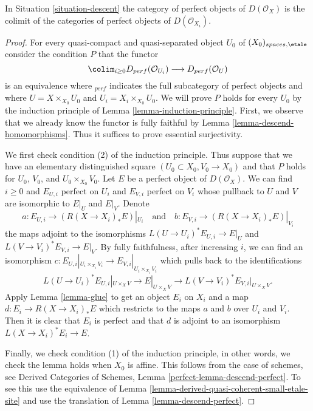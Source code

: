 \begin{lemma}
\label{lemma-perfect-on-limit}
In Situation \ref{situation-descent} the category of perfect
objects of $D(\mathcal{O}_X)$ is the colimit of the categories
of perfect objects of $D(\mathcal{O}_{X_i})$.
\end{lemma}

\begin{proof}
For every quasi-compact and quasi-separated object $U_0$ of
$(X_0)_{spaces, \etale}$ consider the condition $P$ that
the functor
$$
\colim_{i \geq 0} D_{perf}(\mathcal{O}_{U_i})
\longrightarrow
D_{perf}(\mathcal{O}_U)
$$
is an equivalence where ${}_{perf}$ indicates the full subcategory of
perfect objects and where $U = X \times_{X_0} U_0$ and
$U_i = X_i \times_{X_0} U_0$. We will prove $P$ holds for every $U_0$
by the induction principle of Lemma \ref{lemma-induction-principle}.
First, we observe that we already know the functor is fully faithful
by Lemma \ref{lemma-descend-homomorphisms}. Thus it suffices to prove
essential surjectivity.

\medskip\noindent
We first check condition (2) of the induction principle. Thus suppose
that we have an elementary distinguished square
$(U_0 \subset X_0, V_0 \to X_0)$ and that $P$ holds for
$U_0$, $V_0$, and $U_0 \times_{X_0} V_0$. Let $E$ be a perfect object
of $D(\mathcal{O}_X)$. We can find $i \geq 0$ and $E_{U, i}$ perfect on $U_i$
and $E_{V, i}$ perfect on $V_i$ whose pullback to $U$ and $V$ are isomorphic
to $E|_U$ and $E|_V$. Denote
$$
a : E_{U, i} \to (R(X \to X_i)_*E)|_{U_i}
\quad\text{and}\quad
b : E_{V, i} \to (R(X \to X_i)_*E)|_{V_i}
$$
the maps adjoint to the isomorphisms $L(U \to U_i)^*E_{U, i} \to E|_U$
and $L(V \to V_i)^*E_{V, i} \to E|_V$. By fully faithfulness, after
increasing $i$, we can find an isomorphism
$c : E_{U, i}|_{U_i \times_{X_i} V_i} \to E_{V, i}|_{U_i \times_{X_i} V_i}$
which pulls back to the identifications 
$$
L(U \to U_i)^*E_{U, i}|_{U \times_X V} \to E|_{U \times_X V} \to
L(V \to V_i)^*E_{V, i}|_{U \times_X V}.
$$
Apply Lemma \ref{lemma-glue}
to get an object $E_i$ on $X_i$ and a map $d : E_i \to R(X \to X_i)_*E$
which restricts to the maps $a$ and $b$ over $U_i$ and $V_i$.
Then it is clear that $E_i$ is perfect and that
$d$ is adjoint to an isomorphism $L(X \to X_i)^*E_i \to E$.

\medskip\noindent
Finally, we check condition (1) of the induction principle, in other
words, we check the lemma holds when $X_0$ is affine.
This follows from the case of schemes, see
Derived Categories of Schemes, Lemma \ref{perfect-lemma-descend-perfect}.
To see this use the equivalence of
Lemma \ref{lemma-derived-quasi-coherent-small-etale-site}
and use the translation of Lemma \ref{lemma-descend-perfect}.
\end{proof}


















